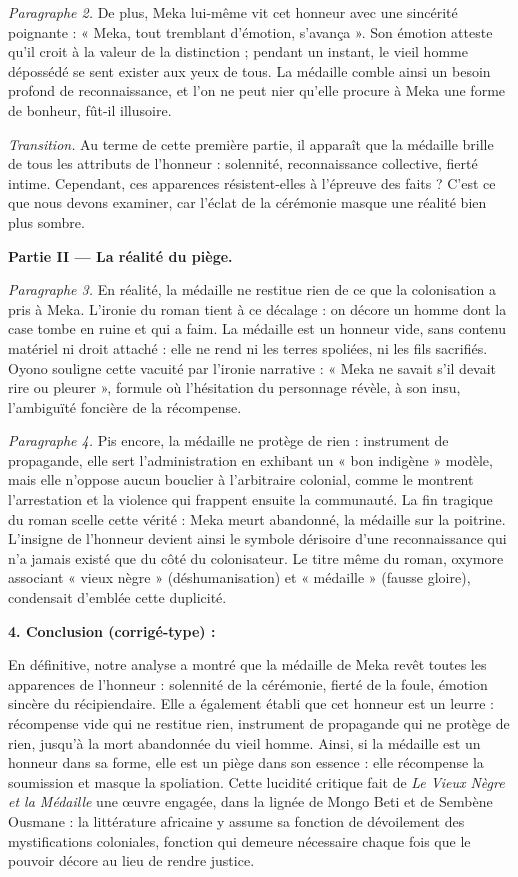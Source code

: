 \documentclass[11pt]{article}
\begin{document}
\begin{corrige}
\emph{Paragraphe 2.} De plus, Meka lui-même vit cet honneur avec une sincérité poignante : « Meka, tout tremblant d'émotion, s'avança ». Son émotion atteste qu'il croit à la valeur de la distinction ; pendant un instant, le vieil homme dépossédé se sent exister aux yeux de tous. La médaille comble ainsi un besoin profond de reconnaissance, et l'on ne peut nier qu'elle procure à Meka une forme de bonheur, fût-il illusoire.

\emph{Transition.} Au terme de cette première partie, il apparaît que la médaille brille de tous les attributs de l'honneur : solennité, reconnaissance collective, fierté intime. Cependant, ces apparences résistent-elles à l'épreuve des faits ? C'est ce que nous devons examiner, car l'éclat de la cérémonie masque une réalité bien plus sombre.

\textbf{Partie II — La réalité du piège.}

\emph{Paragraphe 3.} En réalité, la médaille ne restitue rien de ce que la colonisation a pris à Meka. L'ironie du roman tient à ce décalage : on décore un homme dont la case tombe en ruine et qui a faim. La médaille est un honneur vide, sans contenu matériel ni droit attaché : elle ne rend ni les terres spoliées, ni les fils sacrifiés. Oyono souligne cette vacuité par l'ironie narrative : « Meka ne savait s'il devait rire ou pleurer », formule où l'hésitation du personnage révèle, à son insu, l'ambiguïté foncière de la récompense.

\emph{Paragraphe 4.} Pis encore, la médaille ne protège de rien : instrument de propagande, elle sert l'administration en exhibant un « bon indigène » modèle, mais elle n'oppose aucun bouclier à l'arbitraire colonial, comme le montrent l'arrestation et la violence qui frappent ensuite la communauté. La fin tragique du roman scelle cette vérité : Meka meurt abandonné, la médaille sur la poitrine. L'insigne de l'honneur devient ainsi le symbole dérisoire d'une reconnaissance qui n'a jamais existé que du côté du colonisateur. Le titre même du roman, oxymore associant « vieux nègre » (déshumanisation) et « médaille » (fausse gloire), condensait d'emblée cette duplicité.

\textbf{4. Conclusion (corrigé-type) :}

En définitive, notre analyse a montré que la médaille de Meka revêt toutes les apparences de l'honneur : solennité de la cérémonie, fierté de la foule, émotion sincère du récipiendaire. Elle a également établi que cet honneur est un leurre : récompense vide qui ne restitue rien, instrument de propagande qui ne protège de rien, jusqu'à la mort abandonnée du vieil homme. Ainsi, si la médaille est un honneur dans sa forme, elle est un piège dans son essence : elle récompense la soumission et masque la spoliation. Cette lucidité critique fait de \emph{Le Vieux Nègre et la Médaille} une œuvre engagée, dans la lignée de Mongo Beti et de Sembène Ousmane : la littérature africaine y assume sa fonction de dévoilement des mystifications coloniales, fonction qui demeure nécessaire chaque fois que le pouvoir décore au lieu de rendre justice.


\end{corrige}
\end{document}
